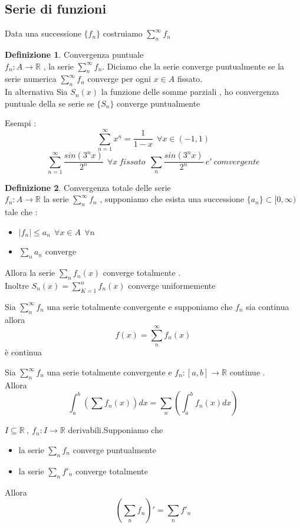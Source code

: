 \documentclass{article}
\theoremstyle{definition}
\newtheorem*{definizione}{Definizione}
\newcommand{\R}{\mathbb{R}}
\begin{document}
\subsection{Serie di funzioni }
Data una successione $\{f_n\}$ costruiamo $\sum_{n}^{\infty}f_n$
\begin{definizione}
Convergenza puntuale \\
$f_n:A\rightarrow \R$ , la serie $\sum_{n}^{\infty}f_n$. Diciamo che la serie converge puntualmente se la serie numerica $\sum_{n}^{\infty}f_n$ converge per ogni $x\in A$ fissato.\\
In alternativa Sia $S_n(x)$ la funzione delle somme parziali , ho convergenza puntuale della se serie se $\{S_n\}$ converge puntualmente 
\end{definizione}
Esempi :
$$\sum_{n=1}^{\infty} x^n=\frac{1}{1-x} \ \ \forall x \in (-1,1)$$
$$\sum_{n=1}^{\infty} \frac{sin(3^n x)}{2^n} \ \ \forall x \ fissato \ \ \sum_n \frac{sin(3^n x)}{2^n} \ e' \ comvergente $$
\begin{definizione}
Convergenza totale delle serie \\
$f_n:A\rightarrow \R$ la serie $\sum_{n}^{\infty}f_n$ , supponiamo che esista una successione $\{a_n\}\subset [0,\infty)$ tale che :
\begin{itemize}
\item $|f_n| \leq a_n \ \ \forall x \in A \ \ \forall n$
\item $\sum_{n}a_n$ converge
\end{itemize}
Allora la serie $\sum_n f_n(x)$ converge totalmente .\\
Inoltre $S_n(x)=\sum_{K=1}^{n}f_n(x)$ converge uniformemente 
\end{definizione}
\begin{teo}{}{}
Sia $\sum_{n}^{\infty}f_n$ una serie totalmente convergente e supponiamo che $f_n$ sia continua allora $$f(x)=\sum_{n}^{\infty}f_n(x)$$ è continua
\end{teo}
\begin{teo}{}{}
Sia $\sum_{n}^{\infty}f_n$ una serie totalmente convergente e  $f_n:[a,b]\rightarrow \R$ continue .\\Allora
$$\int_{a}^{b}\left( \sum f_n(x)\right) dx=\sum_n\left(\int_{a}^{b}f_n(x)dx \right)  $$
\end{teo}
\begin{teo}{}{}
$I\subseteq\R \ , \ f_n:I\rightarrow \R$ derivabili.Supponiamo che 
\begin{itemize}
\item la serie $\sum_{n}f_n$ converge puntualmente 
\item la serie $\sum_{n}f'_n$ converge totalmente 
\end{itemize}
Allora 
$$\left( \sum_{n}f_n\right)'=\sum_{n}f'_n$$ 
\end{teo}
\end{document}
